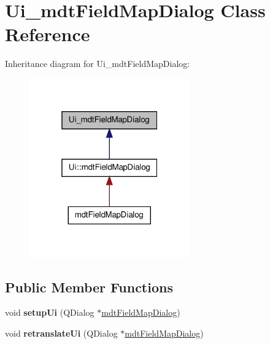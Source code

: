 \hypertarget{class_ui__mdt_field_map_dialog}{
\section{Ui\_\-mdtFieldMapDialog Class Reference}
\label{class_ui__mdt_field_map_dialog}
}


Inheritance diagram for Ui\_\-mdtFieldMapDialog:\nopagebreak
\begin{figure}[H]
\begin{center}
\leavevmode
\includegraphics[width=196pt]{class_ui__mdt_field_map_dialog__inherit__graph}
\end{center}
\end{figure}
\subsection*{Public Member Functions}
\begin{DoxyCompactItemize}
\item 
\hypertarget{class_ui__mdt_field_map_dialog_a7d58994b0e701889b8fbf84f44118def}{
void {\bfseries setupUi} (QDialog $\ast$\hyperlink{classmdt_field_map_dialog}{mdtFieldMapDialog})}
\label{class_ui__mdt_field_map_dialog_a7d58994b0e701889b8fbf84f44118def}

\item 
\hypertarget{class_ui__mdt_field_map_dialog_a9d423cec8b0ff24420f926495eb1f4ad}{
void {\bfseries retranslateUi} (QDialog $\ast$\hyperlink{classmdt_field_map_dialog}{mdtFieldMapDialog})}
\label{class_ui__mdt_field_map_dialog_a9d423cec8b0ff24420f926495eb1f4ad}

\end{DoxyCompactItemize}
